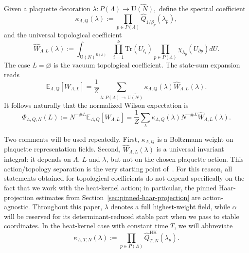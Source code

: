\documentclass[11pt,a4paper,reqno]{amsart}
\theoremstyle{definition}
\theoremstyle{remark}
\newcommand\U{{\mathrm U}}
\newcommand\E{{\mathbb E}}
\newcommand\Tr{{\mathrm{Tr}}}
\newcommand\HK{{\mathrm{HK}}}
\begin{document}
Given a plaquette decoration $\lambda:P(\Lambda)\longrightarrow \widehat{\U(N)},$ define the spectral coefficient
\begin{equation}\label{eq:kappa-def}
\kappa_{\Lambda,Q}(\lambda):=\prod_{p\in P(\Lambda)}\widehat Q_{1/\beta_p}(\lambda_p),
\end{equation}
and the universal topological coefficient
\begin{equation}\label{eq:kappa-W}
\widehat W_{\Lambda,L}(\lambda):=\int_{\U(N)^{E(\Lambda)}}\prod_{i=1}^k\Tr(U_{\ell_i})\prod_{p\in P(\Lambda)}\chi_{\lambda_p}(U_{\partial p}) dU .
\end{equation}
The case $L=\varnothing$ is the vacuum topological coefficient. The state-sum expansion~\cite[Theorem~1.1]{Lem26a} reads
\begin{equation}\label{eq:state-sum}
\E_{\Lambda,Q}[W_{\Lambda,L}]=\frac{1}{Z}\sum_{\lambda:P(\Lambda)\to\widehat{\U(N)}}\kappa_{\Lambda,Q}(\lambda)\widehat W_{\Lambda,L}(\lambda).
\end{equation}
It follows naturally that the normalized Wilson expectation is
\begin{equation}\label{eq:normalized-state-sum}
\Phi_{\Lambda,Q,N}(L)
:=N^{-\#L}\E_{\Lambda,Q}[W_{\Lambda,L}]
=\frac{1}{Z}
\sum_{\lambda}
\kappa_{\Lambda,Q}(\lambda)N^{-\#L}\widehat W_{\Lambda,L}(\lambda).
\end{equation}

Two comments will be used repeatedly.  First, $\kappa_{\Lambda,Q}$ is a Boltzmann weight on plaquette representation fields.  Second, $\widehat W_{\Lambda,L}(\lambda)$ is a universal invariant integral: it depends on $\Lambda$, $L$ and $\lambda$, but not on the chosen plaquette action.  This action/topology separation is the very starting point of~\cite{Lem26a}. For this reason, all statements obtained for topological coefficients do not depend specifically on the fact that we work with the heat-kernel action; in particular, the pinned Haar-projection estimates from Section~\ref{sec:pinned-haar-projection} are action-agnostic. Throughout this paper, $\lambda$ denotes a full highest-weight field, while $\alpha$ will be reserved for its determinant-reduced stable part when we pass to stable coordinates. In the heat-kernel case with constant time $T$, we will abbreviate
\begin{equation}\label{eq:heat-kernel-kappa}
\kappa_{\Lambda,T,N}(\lambda):=\prod_{p\in P(\Lambda)}\widehat Q^{\HK}_{T,N}(\lambda_p).
\end{equation}
\end{document}

